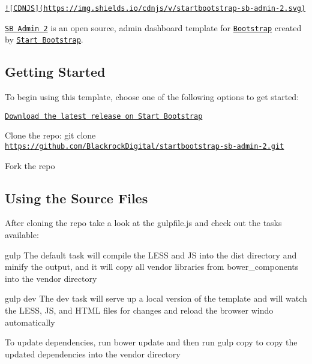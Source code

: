 \href{https://cdnjs.com/libraries/startbootstrap-sb-admin-2}{\tt !\mbox{[}C\-D\-N\-J\-S\mbox{]}(https\-://img.\-shields.\-io/cdnjs/v/startbootstrap-\/sb-\/admin-\/2.\-svg)}

\href{http://startbootstrap.com/template-overviews/sb-admin-2/}{\tt S\-B Admin 2} is an open source, admin dashboard template for \href{http://getbootstrap.com/}{\tt Bootstrap} created by \href{http://startbootstrap.com/}{\tt Start Bootstrap}.

\subsection*{Getting Started}

To begin using this template, choose one of the following options to get started\-:
\begin{DoxyItemize}
\item \href{http://startbootstrap.com/template-overviews/sb-admin-2/}{\tt Download the latest release on Start Bootstrap}
\item Clone the repo\-: {\ttfamily git clone \href{https://github.com/BlackrockDigital/startbootstrap-sb-admin-2.git}{\tt https\-://github.\-com/\-Blackrock\-Digital/startbootstrap-\/sb-\/admin-\/2.\-git}}
\item Fork the repo
\end{DoxyItemize}

\subsection*{Using the Source Files}

After cloning the repo take a look at the {\ttfamily gulpfile.\-js} and check out the tasks available\-:
\begin{DoxyItemize}
\item {\ttfamily gulp} The default task will compile the L\-E\-S\-S and J\-S into the {\ttfamily dist} directory and minify the output, and it will copy all vendor libraries from {\ttfamily bower\-\_\-components} into the {\ttfamily vendor} directory
\item {\ttfamily gulp dev} The dev task will serve up a local version of the template and will watch the L\-E\-S\-S, J\-S, and H\-T\-M\-L files for changes and reload the browser windo automatically
\end{DoxyItemize}

To update dependencies, run {\ttfamily bower update} and then run {\ttfamily gulp copy} to copy the updated dependencies into the {\ttfamily vendor} directory

